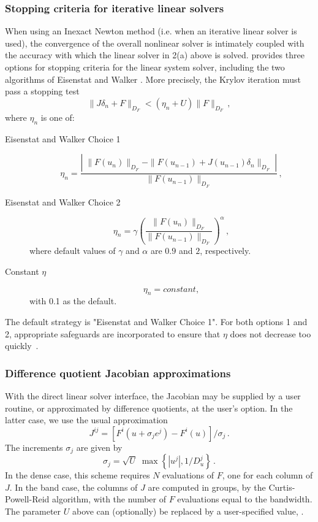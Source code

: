\subsubsection*{Stopping criteria for iterative linear solvers}
When using an Inexact Newton method (i.e. when an iterative linear solver is 
used), the convergence of the overall nonlinear solver is intimately coupled
with the accuracy with which the linear solver in 2(a) above is solved.
{\kinsol} provides three options for stopping criteria for the linear system 
solver, including the two algorithms of Eisenstat and Walker \cite{EiWa:96}. 
More precisely, the Krylov iteration must pass a stopping test
\[ \|J \delta_n + F\|_{D_F} < (\eta_n + U) \|F\|_{D_F} \, , \]
where $\eta_n$ is one of:
\begin{description}
\item[Eisenstat and Walker Choice 1]
  \[
  \eta_n = \frac{\left|\; \|F(u_n)\|_{D_F}
      - \|F(u_{n-1}) + J(u_{n-1}) \delta_n \|_{D_F}
      \; \right|}
  {\|F(u_{n-1})\|_{D_F}} \, ,
  \]
\item[Eisenstat and Walker Choice 2]
  \[
  \eta_n = \gamma
  \left( \frac{ \|F(u_n)\|_{D_F}}{\|F(u_{n-1})\|_{D_F}} \right)^{\alpha} \, ,
  \]
where default values of $\gamma$ and $\alpha$ are $0.9$ and $2$,
respectively.
\item[Constant $\eta$]
  \[
  \eta_n = constant,
  \]
with 0.1 as the default.
\end{description}
The default strategy is "Eisenstat and Walker Choice 1". 
For both options 1 and 2, appropriate safeguards are incorporated to ensure that
$\eta$ does not decrease too quickly~\cite{EiWa:96}.


\subsubsection*{Difference quotient Jacobian approximations}
With the direct linear solver interface, the Jacobian may be supplied
by a user routine, or approximated by difference quotients,
at the user's option.  In the latter case, we use the usual
approximation
\begin{equation}\label{e:JacDQ}
  J^{ij} = [F^i(u+\sigma_j e^j) - F^i(u)]/\sigma_j \, .
\end{equation}
The increments $\sigma_j$ are given by
\begin{equation}\label{e:sigmaDQ_direct}
  \sigma_j = \sqrt{U} \; \max\left\{ |u^j| , 1/D_u^j \right\} \, .
\end{equation}
In the dense case, this scheme requires $N$ evaluations of $F$, 
one for each column of $J$.  In the band case, the columns of 
$J$ are computed in groups, by the Curtis-Powell-Reid algorithm, 
with the number of $F$ evaluations equal to the bandwidth.
The parameter $U$ above can (optionally) be replaced by a
user-specified value, .

